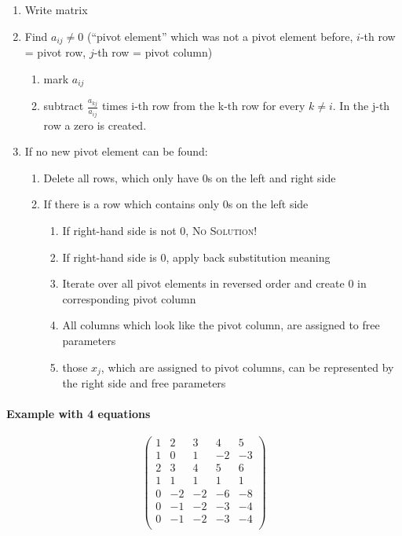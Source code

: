 \documentclass[a4paper,landscape,twocolumn]{article}
\begin{document}
\begin{enumerate}
  \item Write matrix
  \item Find $a_{ij} \neq 0$ (\enquote{pivot element} which was not a pivot element before, $i$-th row = pivot row, $j$-th row = pivot column)
    \begin{enumerate}
      \item mark $a_{ij}$
      \item subtract $\frac{a_{kj}}{a_{ij}}$ times i-th row from the k-th row for every $k \neq i$.
        In the j-th row a zero is created.
    \end{enumerate}
  \item If no new pivot element can be found:
    \begin{enumerate}
      \item Delete all rows, which only have 0s on the left and right side
      \item If there is a row which contains only 0s on the left side
        \begin{enumerate}
          \item If right-hand side is not 0, \textsc{No Solution!}
          \item If right-hand side is 0, apply back substitution meaning
          \item Iterate over all pivot elements in reversed order and create 0 in corresponding pivot column
          \item All columns which look like the pivot column, are assigned to free parameters
          \item those $x_j$, which are assigned to pivot columns, can be represented by the right side and free parameters
        \end{enumerate}
    \end{enumerate}
\end{enumerate}

\paragraph{Example with 4 equations}
\label{sec:1-4-6}

\[
  \left(\begin{array}{cccc|c}
     1 &  2 &  3 &  4 &  5 \\
     1 &  0 &  1 & -2 & -3 \\
     2 &  3 &  4 &  5 &  6 \\
     1 &  1 &  1 &  1 &  1 \\
   \hline
     0 & -2 & -2 & -6 & -8 \\
     0 & -1 & -2 & -3 & -4 \\
     0 & -1 & -2 & -3 & -4 \\
  \end{array}\right)
\]
\end{document}
